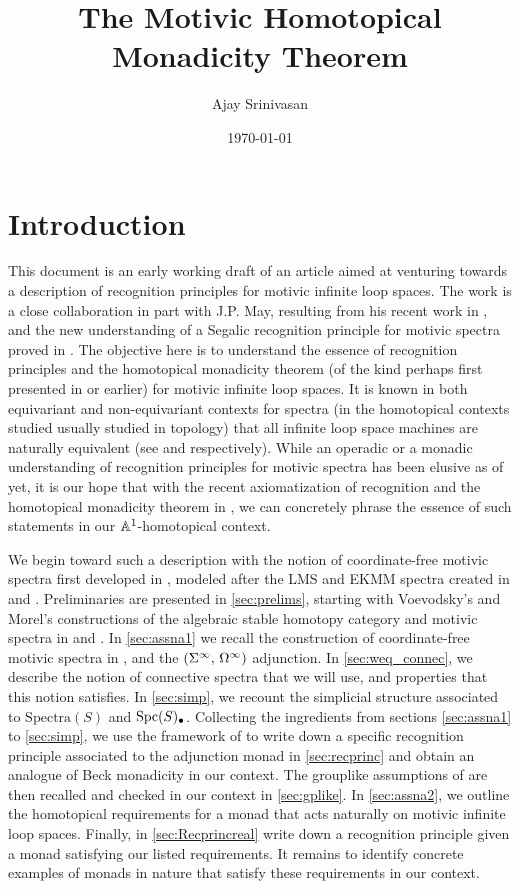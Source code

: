 \documentclass{amsart}
\title{The Motivic Homotopical Monadicity Theorem}
\author{Ajay Srinivasan}
\date{\today}
\theoremstyle{definition}
\begin{document}
\maketitle

\tableofcontents

\section{Introduction}\label{sec:int}
This document is an early working draft of an article aimed at venturing towards a description of recognition principles for motivic infinite loop spaces. The work is a close collaboration in part with J.P. May, resulting from his recent work in \cite{kong2024group}, and the new understanding of a Segalic recognition principle for motivic spectra proved in \cite{EHK21}. The objective here is to understand the essence of recognition principles and the homotopical monadicity theorem (of the kind perhaps first presented in \cite{May72} or earlier) for motivic infinite loop spaces. It is known in both equivariant and non-equivariant contexts for spectra (in the homotopical contexts studied usually studied in topology) that all infinite loop space machines are naturally equivalent (see \cite{may2022equivariant} and \cite{MT78} respectively). While an operadic or a monadic understanding of recognition principles for motivic spectra has been elusive as of yet, it is our hope that with the recent axiomatization of recognition and the homotopical monadicity theorem in \cite{kong2024group}, we can concretely phrase the essence of such statements in our $\mathbb{A}^1$-homotopical context.

We begin toward such a description with the notion of coordinate-free motivic spectra first developed in \cite{Hu03}, modeled after the LMS and EKMM spectra created in \cite{LMS86} and \cite{EKMM97}. Preliminaries are presented in \ref{sec:prelims}, starting with Voevodsky's and Morel's constructions of the algebraic stable homotopy category and motivic spectra in \cite{MV99} and \cite{voev96pre}. In \ref{sec:assna1} we recall the construction of coordinate-free motivic spectra in \cite{Hu03}, and the $(\Sigma^{\infty}, \, \Omega^{\infty})$ adjunction. In \ref{sec:weq_connec}, we describe the notion of connective spectra that we will use, and properties that this notion satisfies. In \ref{sec:simp}, we recount the simplicial structure associated to $\mathrm{Spectra}(S)$ and $\mathrm{Spc}(S)_{\bullet}$. Collecting the ingredients from sections \ref{sec:assna1} to \ref{sec:simp}, we use the framework of \cite{kong2024group} to write down a specific recognition principle associated to the adjunction monad in \ref{sec:recprinc} and obtain an analogue of Beck monadicity in our context. The grouplike assumptions of \cite{kong2024group} are then recalled and checked in our context in \ref{sec:gplike}. In \ref{sec:assna2}, we outline the homotopical requirements for a monad that acts naturally on motivic infinite loop spaces. Finally, in \ref{sec:Recprincreal} write down a recognition principle given a monad satisfying our listed requirements. It remains to identify concrete examples of monads in nature that satisfy these requirements in our context.\\
\end{document}
